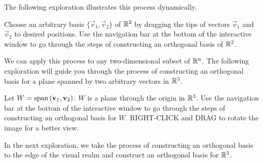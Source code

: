 \documentclass{ximera}
\begin{document}
The following exploration illustrates this process dynamically.

\begin{exploration}\label{exp:orth1}
Choose an arbitrary basis $\{\vec{v}_1, \vec{v}_2\}$ of $\mathbb{R}^2$ by dragging the tips of vectors $\vec{v}_1$ and $\vec{v}_2$ to desired positions.  Use the navigation bar at the bottom of the interactive window to go through the steps of constructing an orthogonal basis of $\mathbb{R}^2$.


\begin{onlineOnly}
\begin{center}
\end{center}
\end{onlineOnly}
\end{exploration}

We can apply this process to any two-dimensional subset of $\mathbb{R}^n$.  The following exploration will guide you through the process of constructing an orthogonal basis for a plane spanned by two arbitrary vectors in $\mathbb{R}^3$.

\begin{exploration}\label{exp:orth2}
Let $W =\mbox{span}\left({\bf v}_1,{\bf v}_2\right)$. $W$ is a plane through the origin in $\mathbb{R}^3$.  Use the navigation bar at the bottom of the interactive window to go through the steps of constructing an orthogonal basis for $W$.  RIGHT-CLICK and DRAG to rotate the image for a better view.


\begin{onlineOnly}
    \begin{center}
\end{center}
\end{onlineOnly}
\end{exploration}

In the next exploration, we take the process of constructing an orthogonal basis to the edge of the visual realm and construct an orthogonal basis for $\mathbb{R}^3$.
\end{document}
